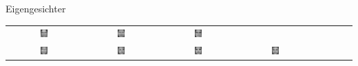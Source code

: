 \documentclass[10pt,aspectratio=169]{beamer}
\begin{document}
\begin{frame}[fragile]{Eigengesichter}
\begin{tabular}{cccccccc}
		\includegraphics[width=0.095\textwidth]{images/eigenfaces/eigenface05} & \includegraphics[width=0.095\textwidth]{images/eigenfaces/eigenface06} &
		\includegraphics[width=0.095\textwidth]{images/eigenfaces/eigenface07} \\ \includegraphics[width=0.095\textwidth]{images/eigenfaces/eigenface08} &
		\includegraphics[width=0.095\textwidth]{images/eigenfaces/eigenface09} & \includegraphics[width=0.095\textwidth]{images/eigenfaces/eigenface10} &
		\includegraphics[width=0.095\textwidth]{images/eigenfaces/eigenface11}
	\end{tabular}
\end{frame}
\end{document}
